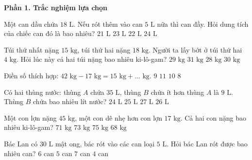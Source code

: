 \textbf{Phần 1. Trắc nghiệm lựa chọn}

\begin{ex} %
Một can dầu chứa $18\text{ L}$. Nếu rót thêm vào can $5\text{ L}$ nữa thì can đầy. Hỏi dung tích của chiếc can đó là bao nhiêu?
\choice
{$21\text{ L}$}
{\True $23\text{ L}$}
{$22\text{ L}$}
{$24\text{ L}$}
\end{ex}

\begin{ex} %
Túi thứ nhất nặng $15\text{ kg}$, túi thứ hai nặng $18\text{ kg}$. Người ta lấy bớt ở túi thứ hai $4\text{ kg}$. Hỏi lúc này cả hai túi nặng bao nhiêu ki-lô-gam?
\choice
{\True $29\text{ kg}$}
{$31\text{ kg}$}
{$28\text{ kg}$}
{$30\text{ kg}$}
\end{ex}

\begin{ex} %
Điền số thích hợp: $42\text{ kg} - 17\text{ kg} = 15\text{ kg} + \dots\text{ kg}$.
\choice
{$9$}
{$11$}
{\True $10$}
{$8$}
\end{ex}

\begin{ex} %
Có hai thùng nước: thùng $A$ chứa $35\text{ L}$, thùng $B$ chứa ít hơn thùng $A$ là $9\text{ L}$. Thùng $B$ chứa bao nhiêu lít nước?
\choice
{$24\text{ L}$}
{$25\text{ L}$}
{$27\text{ L}$}
{\True $26\text{ L}$}
\end{ex}

\begin{ex} %
Một con lợn nặng $45\text{ kg}$, một con dê nhẹ hơn con lợn $17\text{ kg}$. Cả hai con nặng bao nhiêu ki-lô-gam?
\choice
{$71\text{ kg}$}
{\True $73\text{ kg}$}
{$75\text{ kg}$}
{$68\text{ kg}$}
\end{ex}

\begin{ex} %
Bác Lan có $30\text{ L}$ mật ong, bác rót vào các can loại $5\text{ L}$. Hỏi bác Lan rót được bao nhiêu can?
\choice
{\True $6$ can}
{$5$ can}
{$7$ can}
{$4$ can}
\end{ex}

